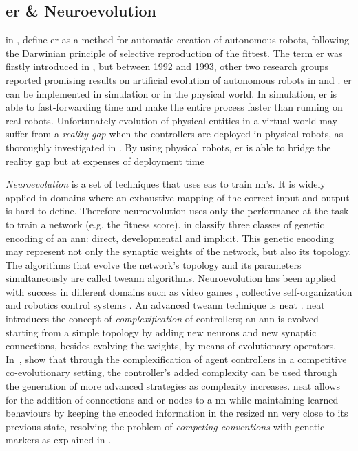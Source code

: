 \documentclass[conference]{IEEEtran}
\begin{document}
\subsection{\acrlong{er} \& Neuroevolution}
\citeauthor{nolfi2000evolutionary} in \cite{nolfi2000evolutionary}, define \gls{er} as a method for automatic creation of autonomous robots, following the Darwinian principle of selective reproduction of the fittest.
The term \acrlong{er} was firstly introduced in \cite{cli1993evolving}, but between 1992 and 1993, other two research groups reported promising results on artificial evolution of autonomous robots in \cite{lewis1992genetic} and \cite{nolfi1994evolve}.
\gls{er} can be implemented in simulation or in the physical world.
In simulation, \gls{er} is able to fast-forwarding time and make the entire process faster than running on real robots.
Unfortunately evolution of physical entities in a virtual world may suffer from a \textit{reality gap} when the controllers are deployed in physical robots, as thoroughly investigated in \cite{jakobi1995noise}.
By using physical robots, \gls{er} is able to bridge the reality gap but at expenses of deployment time

\textit{Neuroevolution} is a set of techniques that uses \glspl{ea} to train \gls{nn}'s.
It is widely applied in domains where an exhaustive mapping of the correct input and output is hard to define.
Therefore neuroevolution uses only the performance at the task to train a network (e.g. the fitness score).
\citeauthor{floreano2008neuroevolution} in \cite{floreano2008neuroevolution} classify three classes of genetic encoding of an \gls{ann}: direct, developmental and implicit.
This genetic encoding may represent not only the synaptic weights of the network, but also its topology.
The algorithms that evolve the network's topology and its parameters simultaneously are called \gls{tweann} algorithms.
Neuroevolution has been applied with success in different domains such as video games \cite{hausknecht2014neuroevolution, stanley2005real}, collective self-organization \cite{nitschke2008neuro, nitschke2010collective} and robotics control systems \cite{brooks1989robot, floreano1996evolution, kodjabachian1998evolution}.
An advanced \gls{tweann} technique is \gls{neat} \cite{stanley2002evolving}.
\gls{neat} introduces the concept of \textit{complexification} of controllers; an \gls{ann} is evolved starting from a simple topology by adding new neurons and new synaptic connections, besides evolving the weights, by means of evolutionary operators.
In~\cite{stanley2004competitive}, \citeauthor{stanley2004competitive} show that through the complexification of agent controllers in a competitive co-evolutionary setting, the controller's added complexity can be used through the generation of more advanced strategies as complexity increases.
\gls{neat} allows for the addition of connections and or nodes to a \gls{nn} while maintaining learned behaviours by keeping the encoded information in the resized \gls{nn} very close to its previous state, resolving the problem of \textit{competing conventions} with genetic markers as explained in \cite{floreano2008neuroevolution, stanley2002evolving}.
\end{document}
